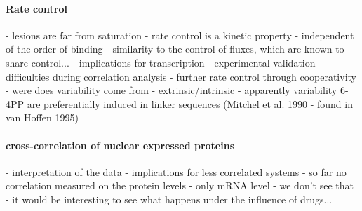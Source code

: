 \paragraph{Rate control}
- lesions are far from saturation 
- rate control is a kinetic property - independent of the order of binding
- similarity to the control of fluxes, which are known to share control...
- implications for transcription 
- experimental validation
- difficulties during correlation analysis
- further rate control through cooperativity 
- were does variability come from - extrinsic/intrinsic
- apparently variability 6-4PP are preferentially induced in linker sequences (Mitchel et al. 1990 - found in van Hoffen 1995)

\paragraph{cross-correlation of nuclear expressed proteins}
- interpretation of the data
- implications for less correlated systems
- so far no correlation measured on the protein levels 
- only mRNA level - we don't see that
- it would be interesting to see what happens under the influence of drugs...

